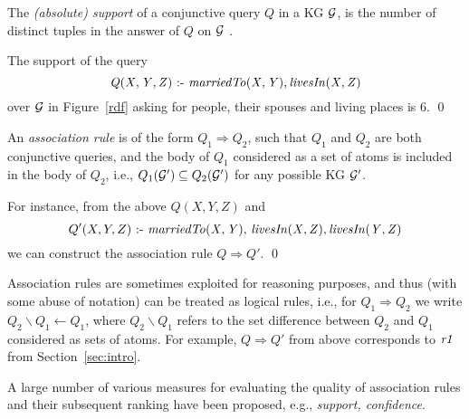 The \emph{(absolute) support} of a conjunctive query $Q$ in a KG $\mathcal{G}$, is the number of distinct tuples in the answer of $Q$ on $\mathcal{G}$ \cite{DBLP:conf/ilp/DehaspeR97}. 

\begin{example}
The support of the query
\begin{equation}\mathit{Q(X,Y,Z)\text{ :- }marriedTo(X,Y),\, }\mathit{livesIn(X,Z)}
\end{equation}
over $\mathcal{G}$ in Figure~\ref{rdf} asking for people, their spouses and living places is $6$. \qed
\end{example} 

\begin{definition}
An \emph{association rule} is of the form $Q_1\Rightarrow Q_2$, such that $Q_1$ and $Q_2$ are both conjunctive queries, and the body of $Q_1$ considered as a set of atoms is included in the body of $Q_2$,  i.e., $Q_1(\mathcal{G}')\subseteq Q_2(\mathcal{G}')$ for any possible KG $\mathcal{G}'$. 
\end{definition}

\begin{example}
For instance, from the above $Q(X,Y,Z)$ and
\begin{equation}Q'(X,Y,Z)\text{ :- }\mathit{marriedTo(X,Y),\,livesIn(X,Z),\,} \mathit{livesIn(Y,Z)}
\end{equation} we can construct the association rule $Q \Rightarrow Q'$. \qed
 \end{example}

Association rules are sometimes exploited for reasoning purposes, and thus (with some abuse of notation) can be treated as logical rules, i.e., for $Q_1 \Rightarrow Q_2$ we write $Q_2\backslash Q_1 \leftarrow Q_1$, where $Q_2 \backslash Q_1$ refers to the set difference between $Q_2$ and $Q_1$ considered as sets of atoms. For example, $Q \Rightarrow Q'$ from above corresponds to $\mathit{r1}$ from Section~\ref{sec:intro}.

A large number of various measures for evaluating the quality of association rules and their subsequent ranking have been proposed, e.g., \emph{support, confidence}. 


